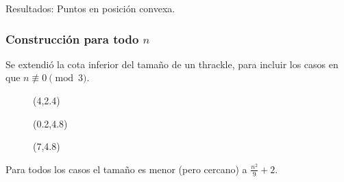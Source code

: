 \documentclass{beamer}
\begin{document}
\begin{frame}[c]
  \begin{center}
    \Huge Resultados: Puntos en posición convexa.
  \end{center}
\end{frame}

%  

\begin{frame}[t]
  \frametitle{Construcción para todo $n$}
  Se extendió la cota inferior del tamaño de un thrackle, para incluir los
  casos en que $n\not\equiv0 \pmod3$.

  \begin{figure}[htb]
    \centering
    \begin{textblock}{5}(4,2.4)
      \def\svgwidth{5cm}
      
    \end{textblock}

    \begin{textblock}{5.5}(0.2,4.8)
      \def\svgwidth{5.5cm}
      
    \end{textblock}

    \begin{textblock}{5.5}(7,4.8)
      \def\svgwidth{5.5cm}
      
    \end{textblock}
  \end{figure}
  \vspace{5.3cm}
  Para todos los casos el tamaño es menor (pero cercano) a $\frac{n^2}{9}+2$.
\end{frame}
\end{document}
